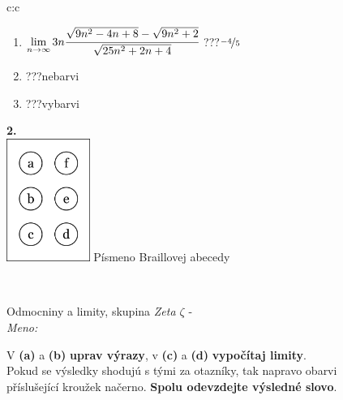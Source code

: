 \documentclass[10pt]{report}
\begin{document}
\begin{tabular}{c:c}
\begin{minipage}[c][104.5mm][t]{0.5\linewidth}
\begin{center}
\begin{minipage}{0.79\linewidth}
\begin{center}
\begin{varwidth}{\linewidth}
\begin{enumerate}
\item $\lim\limits_{n\to\infty}3n\cfrac{\sqrt{9n^2-4n+8}-\sqrt{9n^2+2}}{\sqrt{25n^2+2n+4}}$\quad \dotfill\; ???\;\dotfill \quad $\nicefrac{-4}{5}$
\item \quad \dotfill\; ???\;\dotfill \quad nebarvi
\item \quad \dotfill\; ???\;\dotfill \quad vybarvi
\end{enumerate}
\end{varwidth}
\end{center}
\end{minipage}
\begin{minipage}{0.20\linewidth}
\begin{center}
{\Huge\bfseries 2.} \\[2mm]
\includegraphics[height=40mm]{../images/braille.png}
{\small Písmeno Braillovej abecedy}
\end{center}
\end{minipage}
\end{center}
\end{minipage}
\\ \hdashline
\begin{minipage}[c][104.5mm][t]{0.5\linewidth}
\begin{center}
\vspace{7mm}
{\huge Odmocniny a limity, skupina \textit{Zeta $\zeta$} -}\\[5mm]
\textit{Meno:}\phantom{xxxxxxxxxxxxxxxxxxxxxxxxxxxxxxxxxxxxxxxxxxxxxxxxxxxxxxxxxxxxxxxxx}\\[5mm]
\begin{minipage}{0.95\linewidth}
\begin{center}
V \textbf{(a)} a \textbf{(b)} \textbf{uprav výrazy}, v \textbf{(c)} a \textbf{(d)} \textbf{vypočítaj limity}.\\Pokud se výsledky shodujú s tými za otazníky, tak napravo obarvi\\příslušející kroužek načerno. \textbf{Spolu odevzdejte výsledné slovo}.
\end{center}
\end{minipage}
\\[1mm]

\end{center}
\end{minipage}
\end{tabular}
\end{document}
